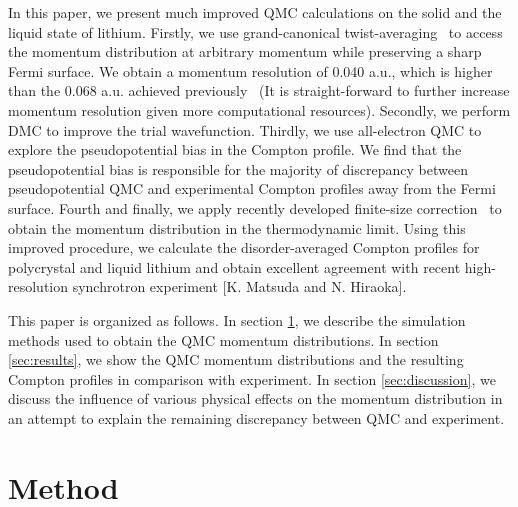 \documentclass[aps,prb,showpacs,preprintnumbers,amsmath,amssymb,superscriptaddress,twocolumn]{revtex4}
\begin{document}
In this paper, we present much improved QMC calculations on the solid and the liquid state of lithium. Firstly, we use grand-canonical twist-averaging~\cite{Lin2001} to access the momentum distribution at arbitrary momentum while preserving a sharp Fermi surface. We obtain a momentum resolution of 0.040 a.u., which is higher than the 0.068 a.u. achieved previously~\cite{Filippi1999} (It is straight-forward to further increase momentum resolution given more computational resources). Secondly, we perform DMC to improve the trial wavefunction. Thirdly, we use all-electron QMC to explore the pseudopotential bias in the Compton profile. We find that the pseudopotential bias is responsible for the majority of discrepancy between pseudopotential QMC and experimental Compton profiles away from the Fermi surface. Fourth and finally, we apply recently developed finite-size correction~\cite{Holzmann2009,Holzmann2011} to obtain the momentum distribution in the thermodynamic limit. Using this improved procedure, we calculate the disorder-averaged Compton profiles for polycrystal and liquid lithium and obtain excellent agreement with recent high-resolution synchrotron experiment [K. Matsuda and N. Hiraoka].

This paper is organized as follows. In section \ref{sec:method}, we describe the simulation methods used to obtain the QMC momentum distributions. In section \ref{sec:results}, we show the QMC momentum distributions and the resulting Compton profiles in comparison with experiment. In section \ref{sec:discussion}, we discuss the influence of various physical effects on the momentum distribution in an attempt to explain the remaining discrepancy between QMC and experiment.

\section{Method} \label{sec:method}
\end{document}
